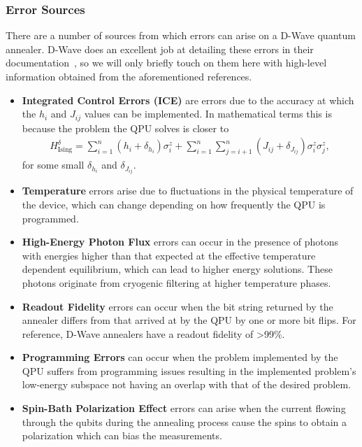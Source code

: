 \subsubsection{Error Sources}
There are a number of sources from which errors can arise on a D-Wave quantum annealer.
D-Wave does an excellent job at detailing these errors in their documentation~\cite{dwave_ice_errors,dwave_other_errors}, so we will only briefly touch on them here with high-level information obtained from the aforementioned references.
\begin{itemize}
    \item \textbf{Integrated Control Errors (ICE)} are errors due to the accuracy at which the \( h_i \) and \( J_{ij} \) values can be implemented.
        In mathematical terms this is because the problem the QPU solves is closer to
        \begin{align}
            H_{\text{Ising}}^\delta = \sum_{i=1}^{n} (h_i + \delta_{h_i}) \sigma_i^z + \sum_{i=1}^{n}\sum_{j=i+1}^n (J_{ij} + \delta_{J_{ij}}) \sigma_i^z \sigma_j^z,
        \end{align}
        for some small \( \delta_{h_i} \) and \( \delta_{J_{ij}} \).
    \item \textbf{Temperature} errors arise due to fluctuations in the physical temperature of the device, which can change depending on how frequently the QPU is programmed.
    \item \textbf{High-Energy Photon Flux} errors can occur in the presence of photons with energies higher than that expected at the effective temperature dependent equilibrium, which can lead to higher energy solutions. These photons originate from cryogenic filtering at higher temperature phases.
    \item \textbf{Readout Fidelity} errors can occur when the bit string returned by the annealer differs from that arrived at by the QPU by one or more bit flips.
        For reference, D-Wave annealers have a readout fidelity of >99\%.
    \item \textbf{Programming Errors} can occur when the problem implemented by the QPU suffers from programming issues resulting in the implemented problem's low-energy subspace not having an overlap with that of the desired problem.
    \item \textbf{Spin-Bath Polarization Effect} errors can arise when the current flowing through the qubits during the annealing process cause the spins to obtain a polarization which can bias the measurements.
\end{itemize}
